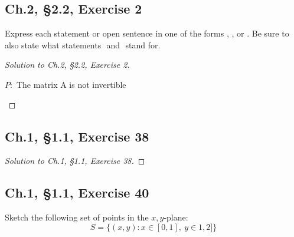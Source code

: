 \documentclass[12pt]{amsart}
\numberwithin{equation}{section}
\theoremstyle{definition}
\theoremstyle{remark}
\begin{document}


\subsection*{Ch.2, \S 2.2,  Exercise 2}  Express each statement or open sentence in one of the forms $ $, $ $, or $ $. Be sure to also state what statements $ $ and $ $ stand for.


\begin{proof}[Solution to Ch.2, \S 2.2,  Exercise 2]
\ \\

\begin{center}
$ \textit{P} : $ The matrix A is not invertible
\end{center}

\end{proof}





\subsection*{Ch.1, \S 1.1,  Exercise 38} 



\begin{proof}[Solution to Ch.1, \S 1.1,  Exercise 38]

\end{proof}




\subsection*{Ch.1, \S 1.1,  Exercise 40} 
 Sketch the following set of points in the $x,y$-plane:
$$
S=\{(x,y): x\in [0,1], \ y\in 1,2]\}
$$
\end{document}
